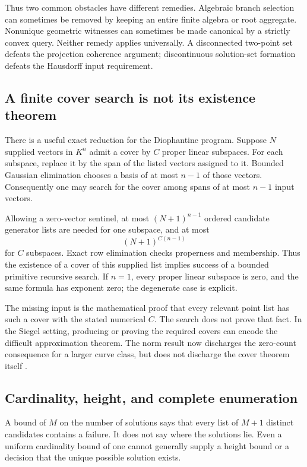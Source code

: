 Thus two common obstacles have different remedies. Algebraic branch selection can sometimes be removed by keeping an entire finite algebra or root aggregate. Nonunique geometric witnesses can sometimes be made canonical by a strictly convex query. Neither remedy applies universally. A disconnected two-point set defeats the projection coherence argument; discontinuous solution-set formation defeats the Hausdorff input requirement.

\subsection{A finite cover search is not its existence theorem}

There is a useful exact reduction for the Diophantine program. Suppose $N$ supplied vectors in $K^n$ admit a cover by $C$ proper linear subspaces. For each subspace, replace it by the span of the listed vectors assigned to it. Bounded Gaussian elimination chooses a basis of at most $n-1$ of those vectors. Consequently one may search for the cover among spans of at most $n-1$ input vectors.

Allowing a zero-vector sentinel, at most $(N+1)^{n-1}$ ordered candidate generator lists are needed for one subspace, and at most
\[
 (N+1)^{C(n-1)}
\]
for $C$ subspaces. Exact row elimination checks properness and membership. Thus the existence of a cover of this supplied list implies success of a bounded primitive recursive search. If $n=1$, every proper linear subspace is zero, and the same formula has exponent zero; the degenerate case is explicit.

The missing input is the mathematical proof that every relevant point list has such a cover with the stated numerical $C$. The search does not prove that fact. In the Siegel setting, producing or proving the required covers can encode the difficult approximation theorem. The norm result now discharges the zero-count consequence for a larger curve class, but does not discharge the cover theorem itself \cite{repo-siegel}.

\subsection{Cardinality, height, and complete enumeration}

A bound of $M$ on the number of solutions says that every list of $M+1$ distinct candidates contains a failure. It does not say where the solutions lie. Even a uniform cardinality bound of one cannot generally supply a height bound or a decision that the unique possible solution exists.

